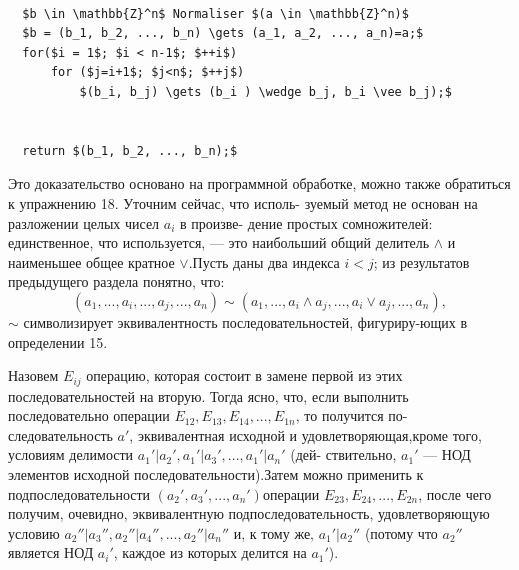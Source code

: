 \begin{lstlisting}[mathescape=true]

  $b \in \mathbb{Z}^n$ Normaliser $(a \in \mathbb{Z}^n)$
  $b = (b_1, b_2, ..., b_n) \gets (a_1, a_2, ..., a_n)=a;$
  for($i = 1$; $i < n-1$; $++i$)
      for ($j=i+1$; $j<n$; $++j$)
          $(b_i, b_j) \gets (b_i ) \wedge b_j, b_i \vee b_j);$
      

  return $(b_1, b_2, ..., b_n);$

\end{lstlisting}
\begin{myproof}\linebreak
Это доказательство основано на программной обработке, можно \linebreak также обратиться к упражнению 18. Уточним сейчас, что исполь- \linebreak зуемый метод не основан на разложении целых чисел $a_i$ в произве- \linebreak дение простых сомножителей: единственное, что используется, --- \linebreak это наибольший общий делитель $\wedge$ и наименьшее общее кратное $\vee$.\linebreak Пусть даны два индекса $i < j$; из результатов предыдущего раздела \linebreak понятно, что:  
$$(a_1,...,a_i,...,a_j,...,a_n) \sim (a_1,...,a_i \wedge a_j,...,a_i \vee a_j,...,a_n),$$
$\sim$ символизирует эквивалентность последовательностей, фигуриру-\linebreak ющих в определении 15.  

\noindent Назовем $E_{ij}$ операцию, которая состоит в замене первой из этих \linebreak последовательностей на вторую. Тогда ясно, что, если выполнить \linebreak последовательно операции $E_{12}, E_{13}, E_{14}, ..., E_{1n}$, то получится по- \linebreak следовательность $a'$, эквивалентная исходной и удовлетворяющая,\linebreak кроме того, условиям делимости $a_1'|a_2', a_1'|a_3', ..., a_1'|a_n'$ (дей- \linebreak ствительно, $a_1'$ --- НОД элементов исходной последовательности).\linebreak Затем можно применить к подпоследовательности $(a_2', a_3',..., a_n')$\linebreak операции $E_{23}, E_{24}, ..., E_{2n}$, после чего получим, очевидно, \linebreak эквивалентную подпоследовательность, удовлетворяющую условию \linebreak $a_2''|a_3'', a_2''|a_4'', ..., a_2''|a_n''$ и, к тому же, $a_1'|a_2''$ (потому что $a_2''$ \linebreak является НОД $a_i'$, каждое из которых делится на $a_1'$).  \newpage


\end{myproof}
